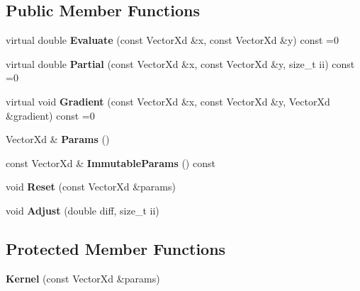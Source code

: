 \subsection*{Public Member Functions}
\begin{DoxyCompactItemize}
\item 
\hypertarget{classgp_1_1_kernel_aa9918f8604f04d60b34a63af9cb266ff}{}\label{classgp_1_1_kernel_aa9918f8604f04d60b34a63af9cb266ff} 
virtual double {\bfseries Evaluate} (const Vector\+Xd \&x, const Vector\+Xd \&y) const =0
\item 
\hypertarget{classgp_1_1_kernel_ab24d8d0274352f66775a945200a0c890}{}\label{classgp_1_1_kernel_ab24d8d0274352f66775a945200a0c890} 
virtual double {\bfseries Partial} (const Vector\+Xd \&x, const Vector\+Xd \&y, size\+\_\+t ii) const =0
\item 
\hypertarget{classgp_1_1_kernel_a6c295cdaae3faa53c57a116256c9a563}{}\label{classgp_1_1_kernel_a6c295cdaae3faa53c57a116256c9a563} 
virtual void {\bfseries Gradient} (const Vector\+Xd \&x, const Vector\+Xd \&y, Vector\+Xd \&gradient) const =0
\item 
\hypertarget{classgp_1_1_kernel_a50cc0098ee88720b46a6b42b854bd238}{}\label{classgp_1_1_kernel_a50cc0098ee88720b46a6b42b854bd238} 
Vector\+Xd \& {\bfseries Params} ()
\item 
\hypertarget{classgp_1_1_kernel_a9afcb83dbab5e1fbc6f8cb58af3c744d}{}\label{classgp_1_1_kernel_a9afcb83dbab5e1fbc6f8cb58af3c744d} 
const Vector\+Xd \& {\bfseries Immutable\+Params} () const
\item 
\hypertarget{classgp_1_1_kernel_a1f98048676af7164184cd23e53aa64cc}{}\label{classgp_1_1_kernel_a1f98048676af7164184cd23e53aa64cc} 
void {\bfseries Reset} (const Vector\+Xd \&params)
\item 
\hypertarget{classgp_1_1_kernel_a24217ef59b1a7da0c930e0969909680b}{}\label{classgp_1_1_kernel_a24217ef59b1a7da0c930e0969909680b} 
void {\bfseries Adjust} (double diff, size\+\_\+t ii)
\end{DoxyCompactItemize}
\subsection*{Protected Member Functions}
\begin{DoxyCompactItemize}
\item 
\hypertarget{classgp_1_1_kernel_a4faf4a711b0d6c88b10643c50f251103}{}\label{classgp_1_1_kernel_a4faf4a711b0d6c88b10643c50f251103} 
{\bfseries Kernel} (const Vector\+Xd \&params)
\end{DoxyCompactItemize}
